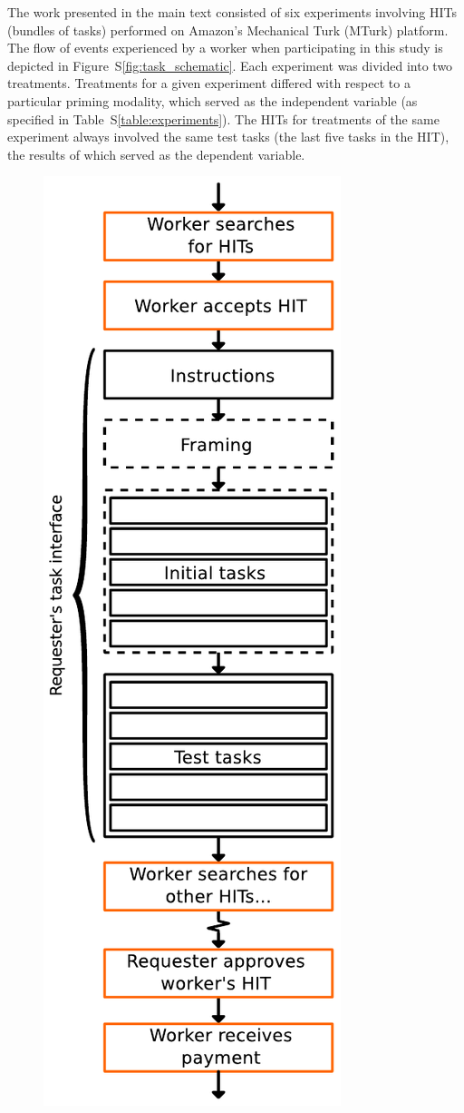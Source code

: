 \documentclass{sigchi}
\begin{document}
The work presented in the main text consisted of six experiments involving
HITs (bundles of tasks) performed on Amazon's Mechanical Turk (MTurk)
platform.  
The flow of events experienced by a worker when participating in this study 
is depicted in Figure~S\ref{fig:task_schematic}.  
Each experiment was divided into two treatments.  Treatments for a given 
experiment differed with respect to a particular priming modality, which 
served as the independent variable
(as specified in Table~S\ref{table:experiments}).  
The HITs for treatments of the same experiment always involved the same
test tasks (the last five tasks in the HIT),
the results of which served as the dependent variable.
\begin{figure}
	\begin{center}
	\includegraphics[scale=0.8]{figs/task_schematic.pdf}

\end{center}
\end{figure}
\end{document}
